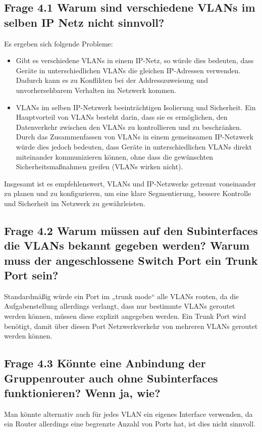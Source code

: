 \documentclass{article}
\begin{document}
\subsection*{Frage 4.1 \normalfont Warum sind verschiedene VLANs im selben IP Netz nicht sinnvoll?}
Es ergeben sich folgende Probleme:
\begin{itemize}
\item Gibt es verschiedene VLANs in einem IP-Netz, so würde dies bedeuten, dass Geräte in unterschiedlichen VLANs die gleichen IP-Adressen verwenden. Dadurch kann es zu Konflikten bei der Addresszuweisung und unvorhersehbarem Verhalten im Netzwerk kommen.
\item VLANs im selben IP-Netzwerk beeinträchtigen Isolierung und Sicherheit. Ein Hauptvorteil von VLANs besteht darin, dass sie es ermöglichen, den Datenverkehr zwischen den VLANs zu kontrollieren und zu beschränken. Durch das Zusammenfassen von VLANs in einem gemeinsamen IP-Netzwerk würde dies jedoch bedeuten, dass Geräte in unterschiedlichen VLANs direkt miteinander kommunizieren können, ohne dass die gewünschten Sicherheitsmaßnahmen greifen (VLANs wirken nicht).
\end{itemize}
Insgesamt ist es empfehlenswert, VLANs und IP-Netzwerke getrennt voneinander zu planen und zu konfigurieren, um eine klare Segmentierung, bessere Kontrolle und Sicherheit im Netzwerk zu gewährleisten.


\subsection*{Frage 4.2 \normalfont Warum müssen auf den Subinterfaces die VLANs bekannt gegeben werden? Warum muss der angeschlossene Switch Port ein Trunk Port sein?}
Standardmäßig würde ein Port im „trunk mode“ alle VLANs routen, da die Aufgabenstellung allerdings verlangt, dass nur bestimmte VLANs geroutet werden können, müssen diese explizit angegeben werden. Ein Trunk Port wird benötigt, damit über diesen Port Netzwerkverkehr von mehreren VLANs geroutet werden können.

\subsection*{Frage 4.3 \normalfont Könnte eine Anbindung der Gruppenrouter auch ohne Subinterfaces funktionieren? Wenn ja, wie?}
Man könnte alternativ auch für jedes VLAN ein eigenes Interface verwenden, da ein Router allerdings eine begrenzte Anzahl von Ports hat, ist dies nicht sinnvoll.
\end{document}
